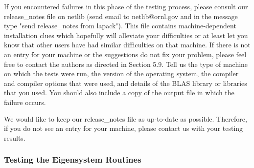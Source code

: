 If you encountered failures in this phase of the testing process, please
consult our release\_notes file on netlib (send email to netlib@ornl.gov
and in the message type "send release\_notes from lapack").  This file
contains machine-dependent installation clues which hopefully will 
alleviate your difficulties or at least let you know that other users
have had similar difficulties on that machine.  If there is not an entry
for your machine or the suggestions do not fix your problem, please feel
free to contact the authors as directed in Section 5.9.  Tell us the 
type of machine on which the tests were run, the version of the operating
system, the compiler and compiler options that were used,
and details of the BLAS library or libraries that you used.  You should
also include a copy of the output file in which the failure occurs.

We would like to keep our release\_notes file as up-to-date as possible.
Therefore, if you do not see an entry for your machine, please contact us
with your testing results.

\subsubsection{Testing the Eigensystem Routines}

